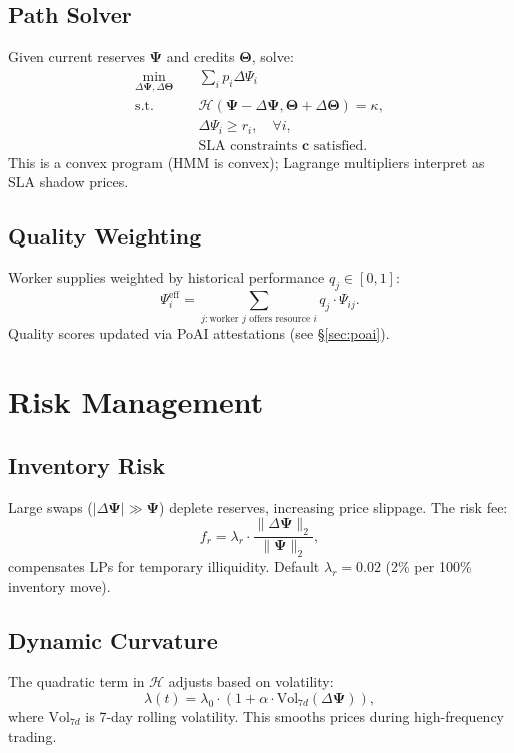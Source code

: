 \documentclass[11pt]{article}
\begin{document}
\subsection{Path Solver}
Given current reserves \(\bm{\Psi}\) and credits \(\bm{\Theta}\), solve:
\begin{align}
\min_{\Delta\bm{\Psi}, \Delta\bm{\Theta}} \quad & \sum_i p_i \Delta\Psi_i \\
\text{s.t.} \quad & \mathcal{H}(\bm{\Psi} - \Delta\bm{\Psi}, \bm{\Theta} + \Delta\bm{\Theta}) = \kappa, \\
& \Delta\Psi_i \ge r_i, \quad \forall i, \\
& \text{SLA constraints } \bm{c} \text{ satisfied}.
\end{align}
This is a convex program (HMM is convex); Lagrange multipliers interpret as SLA shadow prices.

\subsection{Quality Weighting}
Worker supplies weighted by historical performance \(q_j \in [0, 1]\):
\begin{equation}
\Psi_i^{\text{eff}} = \sum_{j: \text{worker } j \text{ offers resource } i} q_j \cdot \Psi_{ij}.
\end{equation}
Quality scores updated via PoAI attestations (see \S\ref{sec:poai}).

\section{Risk Management}
\subsection{Inventory Risk}
Large swaps (\(|\Delta\bm{\Psi}| \gg \bm{\Psi}\)) deplete reserves, increasing price slippage. The risk fee:
\begin{equation}
f_r = \lambda_r \cdot \frac{\|\Delta\bm{\Psi}\|_2}{\|\bm{\Psi}\|_2},
\end{equation}
compensates LPs for temporary illiquidity. Default \(\lambda_r = 0.02\) (2\% per 100\% inventory move).

\subsection{Dynamic Curvature}
The quadratic term in \(\mathcal{H}\) adjusts based on volatility:
\begin{equation}
\lambda(t) = \lambda_0 \cdot \left(1 + \alpha \cdot \text{Vol}_{7d}(\Delta\bm{\Psi})\right),
\end{equation}
where \(\text{Vol}_{7d}\) is 7-day rolling volatility. This smooths prices during high-frequency trading.
\end{document}
